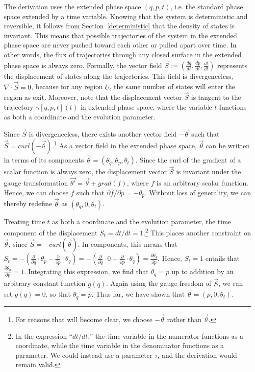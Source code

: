 \documentclass[12pt, twoside]{article}
\renewcommand{\vector}[1]{\ensuremath{\vec{#1}}} %
\begin{document}
The derivation uses the extended phase space $(q, p, t)$, i.e. the standard phase space extended by a time variable. Knowing that the system is deterministic and reversible, it follows from Section~\ref{deterministic} that the density of states is invariant. This means that possible trajectories of the system in the extended phase space are never pushed toward each other or pulled apart over time. In other words, the flux of trajectories through any closed surface in the extended phase space is always zero. Formally, the vector field $\vec{S} := (\frac{d q }{d t }, \frac{d p }{d t }, \frac{d t }{d t })$ represents the displacement of states along the trajectories. This field is divergenceless, $\nabla \cdot \vector{S} = 0$, because for any region $U$, the same number of states will enter the region as exit. Moreover, note that the displacement vector $\vec{S}$ is tangent to the trajectory $\gamma [q, p, t] (t)$ in extended phase space, where the variable $t$ functions as both a coordinate and the evolution parameter.

Since $\vector{S}$ is divergenceless, there exists another vector field $-\vector{\theta}$ such that $\vector{S} = curl(-\vector{\theta} )$.\footnote{For reasons that will become clear, we choose $-\vector{\theta}$ rather than $\vector{\theta}$.} As a vector field in the extended phase space, $\vector{\theta}$ can be written in terms of its components $\vector{\theta} = (\theta_q, \theta_p, \theta_t) $. Since the curl of the gradient of a scalar function is always zero, the displacement vector $\vector{S}$ is invariant under the gauge transformation $\vector{\theta'} =\vector{\theta} + grad(f)$, where $f$ is an arbitrary scalar function. Hence, we can choose $f$ such that $\partial f/ \partial p = -\theta_p $. Without loss of generality, we can thereby redefine $\vector{\theta}$ as $(\theta_q, 0, \theta_t) $.

Treating time $t$ as both a coordinate and the evolution parameter, the time component of the displacement $S_t = dt/ dt = 1$.\footnote{In the expression ``$dt/dt$,'' the time variable in the numerator functions as a coordinate, while the time variable in the denominator functions as a parameter. We could instead use a parameter $\tau$, and the derivation would remain valid.} This places another constraint on $\vector{\theta} $, since $\vector{S} = -curl(\vector{\theta}) $. In components, this means that $S_t = - (\frac{\partial}{\partial q} \cdot \theta_p - \frac{\partial}{\partial p} \cdot \theta_q) = - (\frac{\partial}{\partial q} \cdot 0 - \frac{\partial}{\partial p} \cdot \theta_q) = \frac{\partial \theta_q}{\partial p}$. Hence, $S_t = 1$ entails that $\frac{\partial \theta_q}{\partial p} = 1$. Integrating this expression, we find that $\theta_q = p$ up to addition by an arbitrary constant function $g(q)$. Again using the gauge freedom of $\vector{S}$, we can set $g(q)=0$, so that $\theta_q = p$. Thus far, we have shown that $\vector{\theta} = (p, 0,\theta_t) $.
\end{document}
